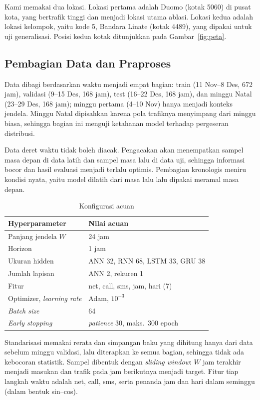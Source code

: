 \documentclass[conference,a4paper]{IEEEtran}
\begin{document}
Kami memakai dua lokasi. Lokasi pertama adalah Duomo (kotak 5060) di pusat kota, yang bertrafik tinggi dan menjadi lokasi utama ablasi. Lokasi kedua adalah lokasi kelompok, yaitu kode 5, Bandara Linate (kotak 4489), yang dipakai untuk uji generalisasi. Posisi kedua kotak ditunjukkan pada Gambar~\ref{fig:peta}.
 
\subsection{Pembagian Data dan Praproses}
Data dibagi berdasarkan waktu menjadi empat bagian: train (11 Nov--8 Des, 672 jam), validasi (9--15 Des, 168 jam), test (16--22 Des, 168 jam), dan minggu Natal (23--29 Des, 168 jam); minggu pertama (4--10 Nov) hanya menjadi konteks jendela. Minggu Natal dipisahkan karena pola trafiknya menyimpang dari minggu biasa, sehingga bagian ini menguji ketahanan model terhadap pergeseran distribusi.
 
Data deret waktu tidak boleh diacak. Pengacakan akan menempatkan sampel masa depan di data latih dan sampel masa lalu di data uji, sehingga informasi bocor dan hasil evaluasi menjadi terlalu optimis. Pembagian kronologis meniru kondisi nyata, yaitu model dilatih dari masa lalu lalu dipakai meramal masa depan.
 
\begin{table}[t]
  \centering
  \caption{Konfigurasi acuan}
  \label{tab:acuan}
  \begin{tabular}{@{}ll@{}}
    \toprule
    Hyperparameter & Nilai acuan \\
    \midrule
    Panjang jendela $W$ & 24 jam \\
    Horizon & 1 jam \\
    Ukuran hidden & ANN 32, RNN 68, LSTM 33, GRU 38 \\
    Jumlah lapisan & ANN 2, rekuren 1 \\
    Fitur & net, call, sms, jam, hari (7) \\
    Optimizer, \textit{learning rate} & Adam, $10^{-3}$ \\
    \textit{Batch size} & 64 \\
    \textit{Early stopping} & \textit{patience} 30, maks.\ 300 epoch \\
    \bottomrule
  \end{tabular}
\end{table}
 
Standarisasi memakai rerata dan simpangan baku yang dihitung hanya dari data sebelum minggu validasi, lalu diterapkan ke semua bagian, sehingga tidak ada kebocoran statistik. Sampel dibentuk dengan \textit{sliding window}: $W$ jam terakhir menjadi masukan dan trafik pada jam berikutnya menjadi target. Fitur tiap langkah waktu adalah net, call, sms, serta penanda jam dan hari dalam seminggu (dalam bentuk sin--cos).
 
\end{document}
